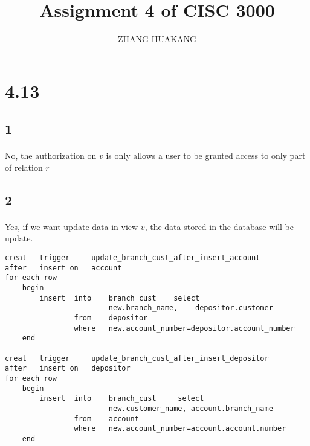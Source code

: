 \documentclass{article}
\title{Assignment 4 of CISC 3000}
\author{ZHANG HUAKANG}
\begin{document}
    \maketitle
    \section*{4.13}
    \subsection*{1}
    \paragraph{}
    No, the authorization on $v$ is only allows a user to be granted access to only part of relation $r$
    \subsection{2}
    \paragraph{}
    Yes, if we want update data in view $v$, the data stored in the database will be update.
    \begin{verbatim}
creat   trigger     update_branch_cust_after_insert_account
after   insert on   account
for each row
    begin   
        insert  into    branch_cust    select
                        new.branch_name,    depositor.customer
                from    depositor
                where   new.account_number=depositor.account_number
    end

creat   trigger     update_branch_cust_after_insert_depositor
after   insert on   depositor
for each row
    begin
        insert  into    branch_cust     select
                        new.customer_name, account.branch_name
                from    account
                where   new.account_number=account.account.number
    end        
    \end{verbatim}
\end{document}
